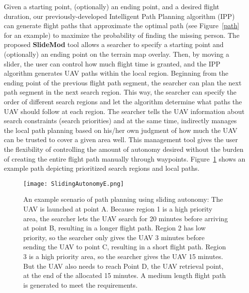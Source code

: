 Given a starting point, (optionally) an ending point, and a desired flight duration, our previously-developed Intelligent Path Planning algorithm (IPP)~\cite{Lin2009UAV} can generate flight paths that approximate the optimal path (see Figure~\ref{path} for an example) to maximize the probability of finding the missing person. The proposed \textbf{SlideMod} tool allows a searcher to specify a starting point and (optionally) an ending point on the terrain map overlay. Then, by moving a slider, the user can control how much flight time is granted, and the IPP algorithm generates UAV paths within the local region. Beginning from the ending point of the previous flight path segment, the searcher can plan the next path segment in the next search region. This way, the searcher can specify the order of different search regions and let the algorithm determine what paths the UAV should follow at each region. The searcher tells the UAV information about search constraints (search priorities) and at the same time, indirectly manages the local path planning based on his/her own judgment of how much the UAV can be trusted to cover a given area well. This management tool gives the user the flexibility of controlling the amount of autonomy desired without the burden of creating the entire flight path manually through waypoints. Figure~\ref{SlidingAutonomy} shows an example path depicting prioritized search regions and local paths.

\begin{figure}
\centering
\texttt{[image: SlidingAutonomyE.png]}
\caption[An example scenario of path planning using sliding autonomy]{An example scenario of path planning using sliding autonomy: The UAV is launched at point A. Because region 1 is a high priority area, the searcher lets the UAV search for 20 minutes before arriving at point B, resulting in a longer flight path. Region 2 has low priority, so the searcher only gives the UAV 3 minutes before sending the UAV to point C, resulting in a short flight path. Region 3 is a high priority area, so the searcher gives the UAV 15 minutes. But the UAV also needs to reach Point D, the UAV retrieval point, at the end of the allocated 15 minutes. A medium length flight path is generated to meet the requirements.}
\label{SlidingAutonomy}
\end{figure}

